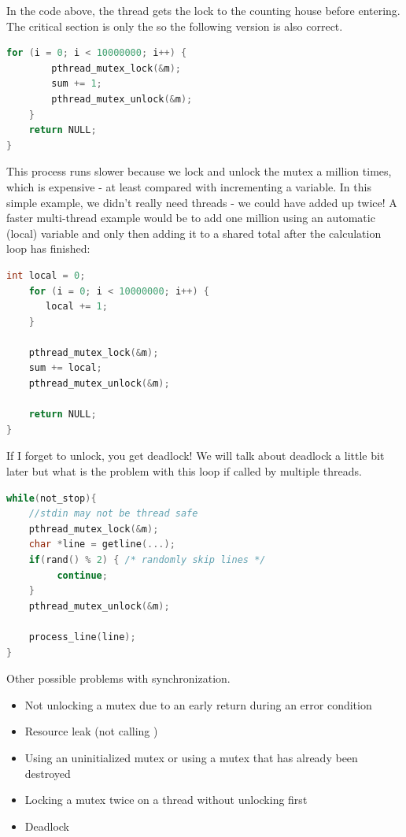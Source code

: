 In the code above, the thread gets the lock to the counting house before entering.
The critical section is only the  so the following version is also correct.

\begin{lstlisting}[language=C]
    for (i = 0; i < 10000000; i++) {
        pthread_mutex_lock(&m);
        sum += 1;
        pthread_mutex_unlock(&m);
    }
    return NULL;
}
\end{lstlisting}

This process runs slower because we lock and unlock the mutex a million times, which is expensive - at least compared with incrementing a variable.
In this simple example, we didn't really need threads - we could have added up twice!
A faster multi-thread example would be to add one million using an automatic (local) variable and only then adding it to a shared total after the calculation loop has finished:

\begin{lstlisting}[language=C]
    int local = 0;
    for (i = 0; i < 10000000; i++) {
       local += 1;
    }

    pthread_mutex_lock(&m);
    sum += local;
    pthread_mutex_unlock(&m);

    return NULL;
}
\end{lstlisting}

If I forget to unlock, you get deadlock!
We will talk about deadlock a little bit later but what is the problem with this loop if called by multiple threads.

\begin{lstlisting}[language=C]
while(not_stop){
    //stdin may not be thread safe
    pthread_mutex_lock(&m);
    char *line = getline(...);
    if(rand() % 2) { /* randomly skip lines */
         continue;
    }
    pthread_mutex_unlock(&m);
    
    process_line(line);
}
\end{lstlisting}

Other possible problems with synchronization.

\begin{itemize}
\tightlist
\item
  Not unlocking a mutex due to an early return during an error condition
\item
  Resource leak (not calling )
\item
  Using an uninitialized mutex or using a mutex that has already been destroyed
\item
  Locking a mutex twice on a thread without unlocking first
\item
  Deadlock
\end{itemize}

